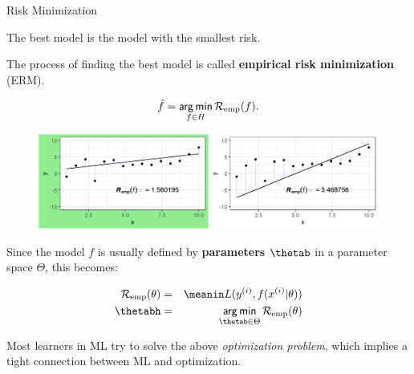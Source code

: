 \documentclass[11pt,compress,t,notes=noshow, xcolor=table]{beamer}
\begin{document}
\begin{vbframe}{Risk Minimization}


The best model is the model with the smallest risk. 

\lz

The process of finding the best model is called \textbf{empirical risk minimization} (ERM).

$$
\hat{f} = \mathop{\sf arg\,min}_{f \in H} \mathcal{R}_{\text{emp}}(f).
$$

\vfill

\begin{center}
\begin{figure}[b]
\includegraphics[width=1\textwidth]{figure_man/ml-basic_riskmin-3-risk-min.png}
\end{figure}
\end{center}


\framebreak

Since the model $f$ is usually defined by \textbf{parameters} $\thetab$ in a parameter space $\Theta$, this becomes:

\begin{eqnarray*}
\risket & = & \meanin \Lxyit \cr
\thetabh & = & \argmin_{\thetab \in \Theta} \risket
\end{eqnarray*}

Most learners in ML try to solve the above \emph{optimization problem}, which
implies a tight connection between ML and optimization.

\end{vbframe}
\end{document}
